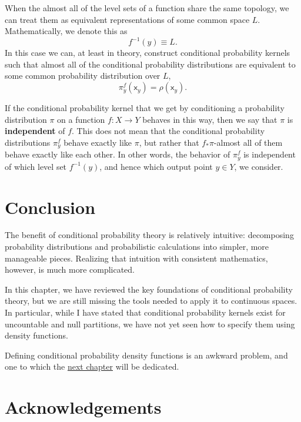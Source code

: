 \documentclass[
  letterpaper,
  DIV=11,
  numbers=noendperiod]{scrartcl}
\begin{document}
When the almost all of the level sets of a function share the same
topology, we can treat them as equivalent representations of some common
space \(L\). Mathematically, we denote this as \[
f^{-1}(y) \equiv L.
\] In this case we can, at least in theory, construct conditional
probability kernels such that almost all of the conditional probability
distributions are equivalent to some common probability distribution
over \(L\), \[
\pi^{f}_{y} ( \mathsf{x}_{y} ) = \rho ( \mathsf{x}_{y} ).
\]

If the conditional probability kernel that we get by conditioning a
probability distribution \(\pi\) on a function \(f : X \rightarrow Y\)
behaves in this way, then we say that \(\pi\) is \textbf{independent} of
\(f\). This does not mean that the conditional probability distributions
\(\pi^{f}_{y}\) behave exactly like \(\pi\), but rather that
\(f_{*} \pi\)-almost all of them behave exactly like each other. In
other words, the behavior of \(\pi^{f}_{y}\) is independent of which
level set \(f^{-1}(y)\), and hence which output point \(y \in Y\), we
consider.

\section{Conclusion}\label{conclusion}

The benefit of conditional probability theory is relatively intuitive:
decomposing probability distributions and probabilistic calculations
into simpler, more manageable pieces. Realizing that intuition with
consistent mathematics, however, is much more complicated.

In this chapter, we have reviewed the key foundations of conditional
probability theory, but we are still missing the tools needed to apply
it to continuous spaces. In particular, while I have stated that
conditional probability kernels exist for uncountable and null
partitions, we have not yet seen how to specify them using density
functions.

Defining conditional probability density functions is an awkward
problem, and one to which the
\href{http://www.symplectomorphic.com/assets/chapters_html/conditional_probability_density_functions.html}{next
chapter} will be dedicated.

\section*{Acknowledgements}\label{acknowledgements}
\end{document}
